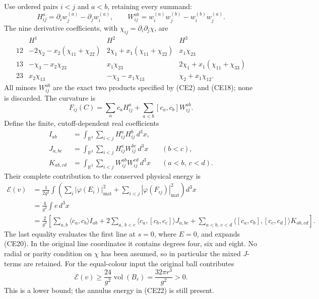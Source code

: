 \documentclass[11pt]{article}
\begin{document}
Use ordered pairs \(i<j\) and \(a<b\), retaining every summand:
\[
 H^a_{ij}=\partial_iw^{(a)}_j-\partial_jw^{(a)}_i,\qquad
 W^{ab}_{ij}=w^{(a)}_iw^{(b)}_j-w^{(b)}_iw^{(a)}_j.
 \tag{CE18}
\]
The nine derivative coefficients, with \(\chi_{ij}=\partial_i\partial_j\chi\),
are
\[
 \begin{array}{c|ccc}
 &H^1&H^2&H^3\\ \hline
 12&-2\chi_2-x_2(\chi_{11}+\chi_{22})
    &2\chi_1+x_1(\chi_{11}+\chi_{22})&x_1\chi_{23}\\
 13&-\chi_3-x_2\chi_{23}&x_1\chi_{23}
    &2\chi_1+x_1(\chi_{11}+\chi_{33})\\
 23&x_2\chi_{13}&-\chi_3-x_1\chi_{13}&\chi_2+x_1\chi_{12}.
 \end{array}\tag{CE19}
\]
All minors \(W^{ab}_{ij}\) are the exact two products specified by
(CE2) and (CE18); none is discarded. The curvature is
\[
 F_{ij}(C)=\sum_a c_aH^a_{ij}
             +\sum_{a<b}[c_a,c_b]W^{ab}_{ij}.
 \tag{CE20}
\]
Define the finite, cutoff-dependent real coefficients
\[
 \begin{aligned}
 I_{ab}&=\int_{\mathbb R^3}\sum_{i<j}H^a_{ij}H^b_{ij}\,d^3x,\\
 J_{a,bc}&=\int_{\mathbb R^3}\sum_{i<j}H^a_{ij}W^{bc}_{ij}\,d^3x
                   &&(b<c),\\
 K_{ab,cd}&=\int_{\mathbb R^3}\sum_{i<j}W^{ab}_{ij}W^{cd}_{ij}\,d^3x
                   &&(a<b,\ c<d).
 \end{aligned}\tag{CE21}
\]
Their complete contribution to the conserved physical energy is
\[
 \begin{aligned}
 \mathscr E(v)
 &=\frac1{2g^2}\int\left(
       \sum_i|\varphi(E_i)|_{\mathrm{mat}}^2+
       \sum_{i<j}|\varphi(F_{ij})|_{\mathrm{mat}}^2\right)d^3x\\
 &=\frac{4}{g^2}\int e\,d^3x\\
 &=\frac2{g^2}\left[
     \sum_{a,b}\langle c_a,c_b\rangle I_{ab}
     +2\sum_{a,\ b<c}\langle c_a,[c_b,c_c]\rangle J_{a,bc}
     +\sum_{a<b,\ c<d}\langle[c_a,c_b],[c_c,c_d]\rangle K_{ab,cd}
              \right].
 \end{aligned}\tag{CE22}
\]
The last equality evaluates the first line at \(s=0\), where \(E=0\),
and expands (CE20). In the original line coordinates it contains
degrees four, six and eight. No radial or parity condition on \(\chi\)
has been assumed, so in particular the mixed \(J\)-terms are retained.
For the equal-colour input the original ball contributes
\[
 \mathscr E(v)\geq\frac{24}{g^2}\operatorname{vol}(B_r)
               =\frac{32\pi r^3}{g^2}>0.
 \tag{CE23}
\]
This is a lower bound; the annulus energy in (CE22) is still present.
\end{document}
